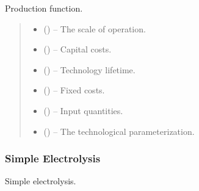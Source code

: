 \documentclass[letterpaper,10pt,english]{sphinxmanual}
\begin{document}
\begin{fulllineitems}
\label{\detokenize{technology:technology.technology_m_model.production}}
\pysigstartsignatures
{}
\pysigstopsignatures
\sphinxAtStartPar
Production function.
\begin{quote}\begin{description}
\begin{itemize}
\item {} 
\sphinxAtStartPar
{} () – The scale of operation.

\item {} 
\sphinxAtStartPar
{} () – Capital costs.

\item {} 
\sphinxAtStartPar
{} () – Technology lifetime.

\item {} 
\sphinxAtStartPar
{} () – Fixed costs.

\item {} 
\sphinxAtStartPar
{} () – Input quantities.

\item {} 
\sphinxAtStartPar
{} () – The technological parameterization.

\end{itemize}

\end{description}\end{quote}

\end{fulllineitems}



\subsubsection{Simple Electrolysis}
\label{\detokenize{technology:module-technology.simple_electrolysis}}\label{\detokenize{technology:simple-electrolysis}}
\sphinxAtStartPar
Simple electrolysis.
\end{document}
